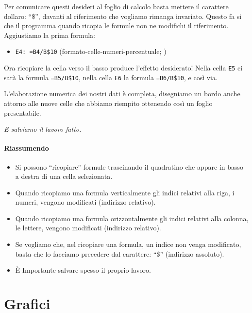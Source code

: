 Per comunicare questi desideri al foglio di calcolo basta mettere il 
carattere dollaro: ``\$'', davanti al riferimento che vogliamo rimanga 
invariato.
Questo fa si che il programma quando ricopia le formule non ne modifichi
il riferimento.
Aggiustiamo la prima formula:

\begin{itemize} [noitemsep]
\item \texttt{E4: =B4/B\$10}
(formato-celle-numeri-percentuale; )
\end{itemize}

Ora ricopiare la cella verso il basso produce l'effetto desiderato!
Nella cella \texttt{E5} ci sarà la formula \texttt{=B5/B\$10},
nella cella \texttt{E6} la formula \texttt{=B6/B\$10}, e così via.

L'elaborazione numerica dei nostri dati è completa,
disegniamo un bordo anche attorno alle nuove celle che abbiamo
riempito ottenendo così un foglio presentabile.

\emph{E salviamo il lavoro fatto.}
\vspace{.5em}

\paragraph{Riassumendo}

\begin{itemize} [nosep]
\item 
Si possono ``ricopiare'' formule trascinando il quadratino che appare in
basso a destra di una cella selezionata.
\item 
Quando ricopiamo una formula verticalmente gli indici relativi alla riga,
i numeri, vengono modificati (indirizzo relativo).
\item 
Quando ricopiamo una formula orizzontalmente gli indici relativi alla
colonna, le lettere, vengono modificati (indirizzo relativo).
\item 
Se vogliamo che, nel ricopiare una formula, un indice non venga modificato,
basta che lo facciamo precedere dal carattere: ``\$'' (indirizzo assoluto).
\item È Importante salvare spesso il proprio lavoro.
\end{itemize}

\section{Grafici}
\label{fogliodicalcolo:grafici}


